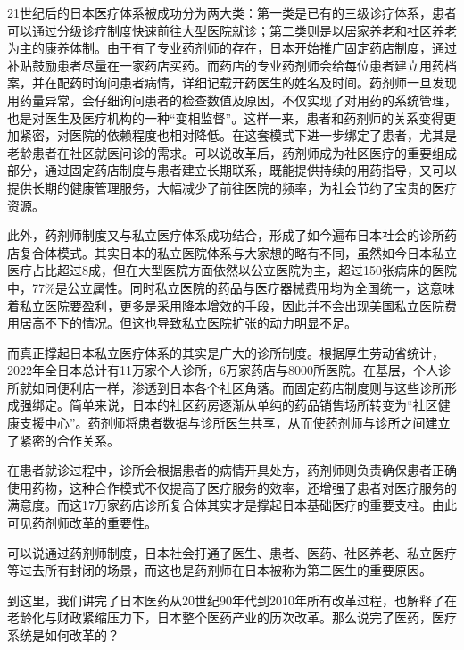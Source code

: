 21世纪后的日本医疗体系被成功分为两大类：第一类是已有的三级诊疗体系，患者可以通过分级诊疗制度快速前往大型医院就诊；第二类则是以居家养老和社区养老为主的康养体制。由于有了专业药剂师的存在，日本开始推广固定药店制度，通过补贴鼓励患者尽量在一家药店买药。而药店的专业药剂师会给每位患者建立用药档案，并在配药时询问患者病情，详细记载开药医生的姓名及时间。药剂师一旦发现用药量异常，会仔细询问患者的检查数值及原因，不仅实现了对用药的系统管理，也是对医生及医疗机构的一种“变相监督”。这样一来，患者和药剂师的关系变得更加紧密，对医院的依赖程度也相对降低。在这套模式下进一步绑定了患者，尤其是老龄患者在社区就医问诊的需求。可以说改革后，药剂师成为社区医疗的重要组成部分，通过固定药店制度与患者建立长期联系，既能提供持续的用药指导，又可以提供长期的健康管理服务，大幅减少了前往医院的频率，为社会节约了宝贵的医疗资源。

此外，药剂师制度又与私立医疗体系成功结合，形成了如今遍布日本社会的诊所药店复合体模式。其实日本的私立医院体系与大家想的略有不同，虽然如今日本私立医疗占比超过8成，但在大型医院方面依然以公立医院为主，超过150张病床的医院中，77\%是公立属性。同时私立医院的药品与医疗器械费用均为全国统一，这意味着私立医院要盈利，更多是采用降本增效的手段，因此并不会出现美国私立医院费用居高不下的情况。但这也导致私立医院扩张的动力明显不足。

而真正撑起日本私立医疗体系的其实是广大的诊所制度。根据厚生劳动省统计，2022年全日本总计有11万家个人诊所，6万家药店与8000所医院。在基层，个人诊所就如同便利店一样，渗透到日本各个社区角落。而固定药店制度则与这些诊所形成强绑定。简单来说，日本的社区药房逐渐从单纯的药品销售场所转变为“社区健康支援中心”。药剂师将患者数据与诊所医生共享，从而使药剂师与诊所之间建立了紧密的合作关系。

在患者就诊过程中，诊所会根据患者的病情开具处方，药剂师则负责确保患者正确使用药物，这种合作模式不仅提高了医疗服务的效率，还增强了患者对医疗服务的满意度。而这17万家药店诊所复合体其实才是撑起日本基础医疗的重要支柱。由此可见药剂师改革的重要性。

可以说通过药剂师制度，日本社会打通了医生、患者、医药、社区养老、私立医疗等过去所有封闭的场景，而这也是药剂师在日本被称为第二医生的重要原因。

到这里，我们讲完了日本医药从20世纪90年代到2010年所有改革过程，也解释了在老龄化与财政紧缩压力下，日本整个医药产业的历次改革。那么说完了医药，医疗系统是如何改革的？
